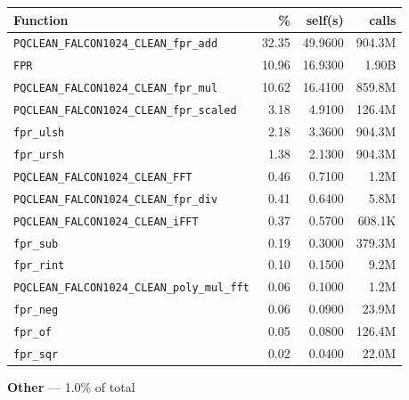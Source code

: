 \documentclass[11pt,a4paper]{article}
\begin{document}
\begin{longtable}{p{7.5cm}rrr}
\toprule
Function & \% & self(s) & calls \\
\midrule
\endhead
  \texttt{PQCLEAN\_FALCON1024\_CLEAN\_fpr\_add} & 32.35 & 49.9600 & 904.3M \\
  \texttt{FPR} & 10.96 & 16.9300 & 1.90B \\
  \texttt{PQCLEAN\_FALCON1024\_CLEAN\_fpr\_mul} & 10.62 & 16.4100 & 859.8M \\
  \texttt{PQCLEAN\_FALCON1024\_CLEAN\_fpr\_scaled} & 3.18 & 4.9100 & 126.4M \\
  \texttt{fpr\_ulsh} & 2.18 & 3.3600 & 904.3M \\
  \texttt{fpr\_ursh} & 1.38 & 2.1300 & 904.3M \\
  \texttt{PQCLEAN\_FALCON1024\_CLEAN\_FFT} & 0.46 & 0.7100 & 1.2M \\
  \texttt{PQCLEAN\_FALCON1024\_CLEAN\_fpr\_div} & 0.41 & 0.6400 & 5.8M \\
  \texttt{PQCLEAN\_FALCON1024\_CLEAN\_iFFT} & 0.37 & 0.5700 & 608.1K \\
  \texttt{fpr\_sub} & 0.19 & 0.3000 & 379.3M \\
  \texttt{fpr\_rint} & 0.10 & 0.1500 & 9.2M \\
  \texttt{PQCLEAN\_FALCON1024\_CLEAN\_poly\_mul\_fft} & 0.06 & 0.1000 & 1.2M \\
  \texttt{fpr\_neg} & 0.06 & 0.0900 & 23.9M \\
  \texttt{fpr\_of} & 0.05 & 0.0800 & 126.4M \\
  \texttt{fpr\_sqr} & 0.02 & 0.0400 & 22.0M \\
\bottomrule
\end{longtable}

\noindent\colorbox{othercolor}{\strut \textbf{Other} --- 1.0\% of total}
\vspace{2pt}
\end{document}
